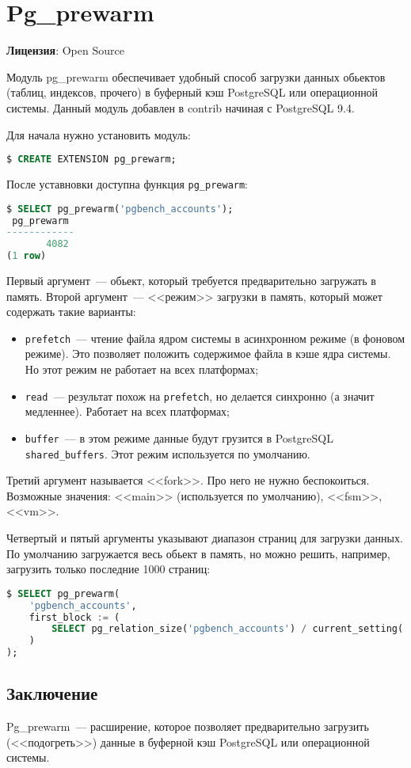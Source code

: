\section{Pg\_prewarm}
\textbf{Лицензия}: Open Source

Модуль pg\_prewarm обеспечивает удобный способ загрузки данных обьектов (таблиц, индексов, прочего) в буферный кэш PostgreSQL или операционной системы. Данный модуль добавлен в contrib начиная с PostgreSQL 9.4.

Для начала нужно установить модуль:

\begin{lstlisting}[language=SQL,label=lst:pgprewarm1]
$ CREATE EXTENSION pg_prewarm;
\end{lstlisting}

После уставновки доступна функция \lstinline!pg_prewarm!:

\begin{lstlisting}[language=SQL,label=lst:pgprewarm2]
$ SELECT pg_prewarm('pgbench_accounts');
 pg_prewarm
------------
       4082
(1 row)
\end{lstlisting}

Первый аргумент~--- обьект, который требуется предварительно загружать в память. Второй аргумент~--- <<режим>> загрузки в память, который может содержать такие варианты:

\begin{itemize}
  \item \lstinline!prefetch!~--- чтение файла ядром системы в асинхронном режиме (в фоновом режиме). Это позволяет положить содержимое файла в кэше ядра системы. Но этот режим не работает на всех платформах;
  \item \lstinline!read!~--- результат похож на \lstinline!prefetch!, но делается синхронно (а значит медленнее). Работает на всех платформах;
  \item \lstinline!buffer!~--- в этом режиме данные будут грузится в PostgreSQL \lstinline!shared_buffers!. Этот режим используется по умолчанию.
\end{itemize}

Третий аргумент называется <<fork>>. Про него не нужно беспокоиться. Возможные значения: <<main>> (используется по умолчанию), <<fsm>>, <<vm>>.

Четвертый и пятый аргументы указывают диапазон страниц для загрузки данных. По умолчанию загружается весь обьект в память, но можно решить, например, загрузить только последние 1000 страниц:

\begin{lstlisting}[language=SQL,label=lst:pgprewarm3]
$ SELECT pg_prewarm(
    'pgbench_accounts',
    first_block := (
        SELECT pg_relation_size('pgbench_accounts') / current_setting('block_size')::int4 - 1000
    )
);
\end{lstlisting}


\subsection{Заключение}

Pg\_prewarm~--- расширение, которое позволяет предварительно загрузить (<<подогреть>>) данные в буферной кэш PostgreSQL или операционной системы.